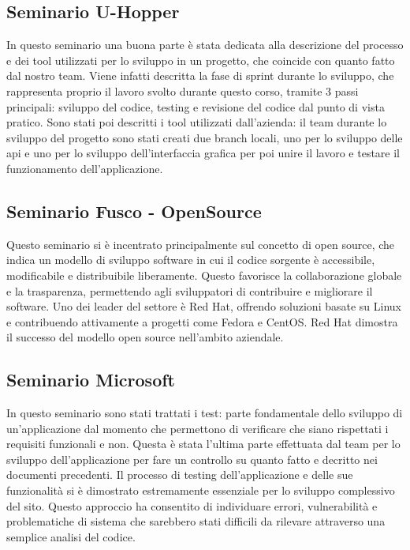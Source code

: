 \documentclass[a4paper,12pt]{article}
\begin{document}
\subsection{Seminario U-Hopper}
In questo seminario una buona parte è stata dedicata alla descrizione del processo e dei tool utilizzati per lo sviluppo in un progetto, che coincide con quanto fatto dal nostro team.
Viene infatti descritta la fase di sprint durante lo sviluppo, che rappresenta proprio il lavoro svolto durante questo corso, tramite 3 passi principali: sviluppo del codice, testing e revisione del codice dal punto di vista pratico.
Sono stati poi descritti i tool utilizzati dall'azienda: il team durante lo sviluppo del progetto sono stati creati due branch locali, uno per lo sviluppo delle api e uno per lo sviluppo dell'interfaccia grafica per poi unire il lavoro e testare il funzionamento dell'applicazione.


\subsection{Seminario Fusco - OpenSource}
Questo seminario si è incentrato principalmente sul concetto di open source, che indica un modello di sviluppo software in cui il codice sorgente è accessibile, modificabile e distribuibile liberamente. \newline
Questo favorisce la collaborazione globale e la trasparenza, permettendo agli sviluppatori di contribuire e migliorare il software.  Uno dei leader del settore è Red Hat, offrendo soluzioni basate su Linux e contribuendo attivamente a progetti come Fedora e CentOS. Red Hat dimostra il successo del modello open source nell'ambito aziendale.



\subsection{Seminario Microsoft}
In questo seminario sono stati trattati i test: parte fondamentale dello sviluppo di un'applicazione dal momento che permettono di verificare che siano rispettati i requisiti funzionali e non. \newline
Questa è stata l'ultima parte effettuata dal team per lo sviluppo dell'applicazione per fare un controllo su quanto fatto e decritto nei documenti precedenti. 
Il processo di testing dell'applicazione e delle sue funzionalità si è dimostrato estremamente essenziale per lo sviluppo complessivo del sito. \newline
Questo approccio ha consentito di individuare errori, vulnerabilità e problematiche di sistema che sarebbero stati difficili da rilevare attraverso una semplice analisi del codice.
\end{document}

